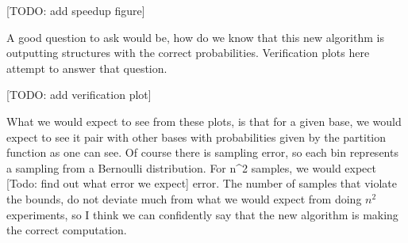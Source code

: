 [TODO: add speedup figure]

A good question to ask would be, how do we know that this new
algorithm is outputting structures with the correct
probabilities. Verification plots here attempt to answer that
question.

[TODO: add verification plot]

What we would expect to see from these plots, is that for a given
base, we would expect to see it pair with other bases with
probabilities given by the partition function as one can see. Of
course there is sampling error, so each bin represents a sampling from
a Bernoulli distribution. For n^2 samples, we would expect [Todo: find
out what error we expect] error. The number of samples that violate
the bounds, do not deviate much from what we would expect from doing
$n^2$ experiments, so I think we can confidently say that the new
algorithm is making the correct computation.
